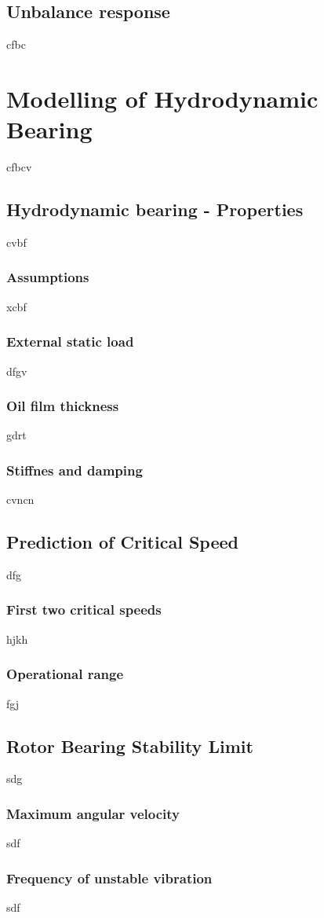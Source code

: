 \subsection{Unbalance response}
cfbc
\section{Modelling of Hydrodynamic Bearing}
cfbcv
\subsection{Hydrodynamic bearing - Properties}
cvbf
\subsubsection{Assumptions}
xcbf
\subsubsection{External static load}
dfgv
\subsubsection{Oil film thickness}
gdrt
\subsubsection{Stiffnes and damping}
cvncn
\subsection{Prediction of Critical Speed}
dfg
\subsubsection{First two critical speeds}
hjkh
\subsubsection{Operational range}
fgj
\subsection{Rotor Bearing Stability Limit}
sdg
\subsubsection{Maximum angular velocity}
sdf
\subsubsection{Frequency of unstable vibration}
sdf
